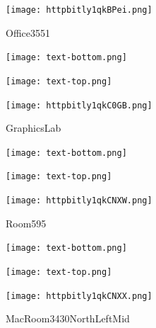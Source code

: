 \documentclass[letterpaper]{article}
\begin{document}
 \begingroup 
 \centerline{\texttt{[image: httpbitly1qkBPei.png]}} 
 \endgroup 
 \vspace*{\fill} 

 \hfill{\small Office3551} 

  \vspace{0.7in} 
 
 \centerline{\texttt{[image: text-bottom.png]}} 
 
 \pagebreak 
{} 
 \vspace*{\fill} 
 
  \centerline{\texttt{[image: text-top.png]}} 
 
 \vspace{0.5in} 
 
 \begingroup 
 \centerline{\texttt{[image: httpbitly1qkC0GB.png]}} 
 \endgroup 
 \vspace*{\fill} 

 \hfill{\small GraphicsLab} 

  \vspace{0.7in} 
 
 \centerline{\texttt{[image: text-bottom.png]}} 
 
 \pagebreak 
{} 
 \vspace*{\fill} 
 
  \centerline{\texttt{[image: text-top.png]}} 
 
 \vspace{0.5in} 
 
 \begingroup 
 \centerline{\texttt{[image: httpbitly1qkCNXW.png]}} 
 \endgroup 
 \vspace*{\fill} 

 \hfill{\small Room595} 

  \vspace{0.7in} 
 
 \centerline{\texttt{[image: text-bottom.png]}} 
 
 \pagebreak 
{} 
 \vspace*{\fill} 
 
  \centerline{\texttt{[image: text-top.png]}} 
 
 \vspace{0.5in} 
 
 \begingroup 
 \centerline{\texttt{[image: httpbitly1qkCNXX.png]}} 
 \endgroup 
 \vspace*{\fill} 

 \hfill{\small MacRoom3430NorthLeftMid} 

  \vspace{0.7in} 
 
\end{document}

